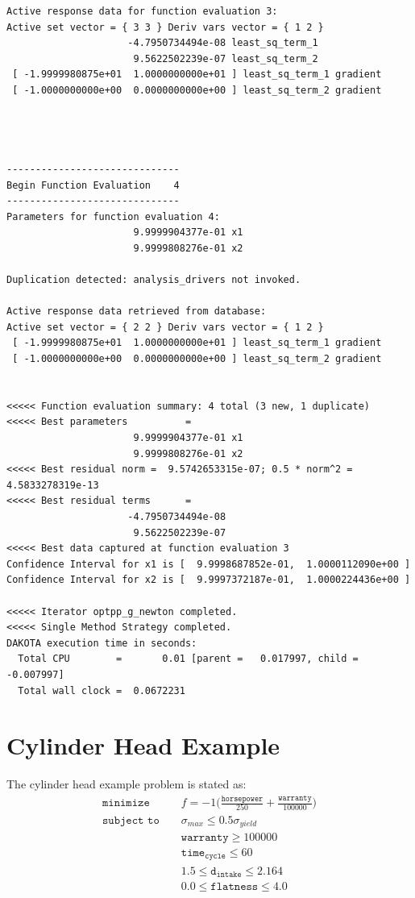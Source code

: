 \begin{small}
\begin{verbatim}
Active response data for function evaluation 3:
Active set vector = { 3 3 } Deriv vars vector = { 1 2 }
                     -4.7950734494e-08 least_sq_term_1
                      9.5622502239e-07 least_sq_term_2
 [ -1.9999980875e+01  1.0000000000e+01 ] least_sq_term_1 gradient
 [ -1.0000000000e+00  0.0000000000e+00 ] least_sq_term_2 gradient




------------------------------
Begin Function Evaluation    4
------------------------------
Parameters for function evaluation 4:
                      9.9999904377e-01 x1
                      9.9999808276e-01 x2

Duplication detected: analysis_drivers not invoked.

Active response data retrieved from database:
Active set vector = { 2 2 } Deriv vars vector = { 1 2 }
 [ -1.9999980875e+01  1.0000000000e+01 ] least_sq_term_1 gradient
 [ -1.0000000000e+00  0.0000000000e+00 ] least_sq_term_2 gradient


<<<<< Function evaluation summary: 4 total (3 new, 1 duplicate)
<<<<< Best parameters          =
                      9.9999904377e-01 x1
                      9.9999808276e-01 x2
<<<<< Best residual norm =  9.5742653315e-07; 0.5 * norm^2 =  4.5833278319e-13
<<<<< Best residual terms      =
                     -4.7950734494e-08
                      9.5622502239e-07
<<<<< Best data captured at function evaluation 3
Confidence Interval for x1 is [  9.9998687852e-01,  1.0000112090e+00 ]
Confidence Interval for x2 is [  9.9997372187e-01,  1.0000224436e+00 ]

<<<<< Iterator optpp_g_newton completed.
<<<<< Single Method Strategy completed.
DAKOTA execution time in seconds:
  Total CPU        =       0.01 [parent =   0.017997, child =  -0.007997]
  Total wall clock =  0.0672231
\end{verbatim}
\end{small}

\section{Cylinder Head Example}\label{additional:cylinder}

The cylinder head example problem is stated as:
\begin{eqnarray}
\texttt{minimize }   & & f=-1\bigg(\frac{\mathtt{horsepower}}{250}+
  \frac{\mathtt{warranty}}{100000}\bigg) \nonumber\\
\texttt{subject to } & & \sigma_{max} \leq 0.5 \sigma_{yield}
  \label{additional:cylhead}\\
                     & & \mathtt{warranty} \geq 100000          \nonumber\\
                     & & \mathtt{time_{cycle}} \leq 60          \nonumber\\
                     & & 1.5 \leq \mathtt{d_{intake}} \leq 2.164\nonumber\\
                     & & 0.0 \leq \mathtt{flatness} \leq 4.0    \nonumber
\end{eqnarray}

